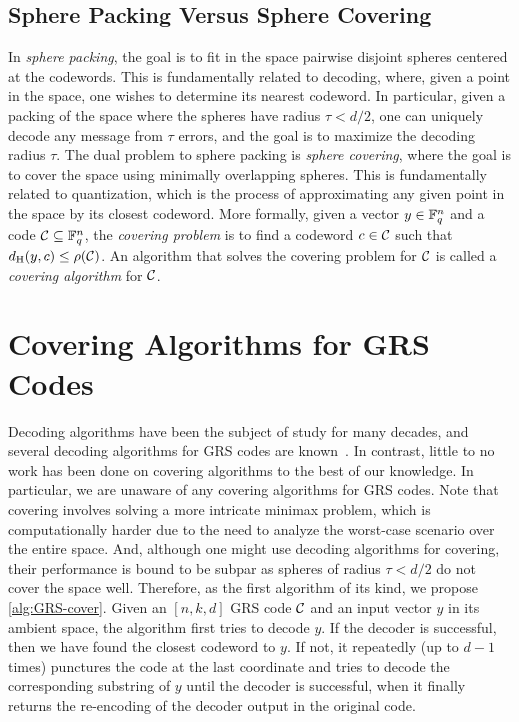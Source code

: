 \documentclass[conference]{IEEEtran}
\begin{document}
\subsection{Sphere Packing Versus Sphere Covering}
\label{sec:packing-covering}

In \emph{sphere packing}, the goal is to fit in the space pairwise disjoint spheres centered at the codewords. This is fundamentally related to decoding, where, given a point in the space, one wishes to determine its nearest codeword. In particular, given a packing of the space where the spheres have radius $\tau < d / 2$, one can uniquely decode any message from $\tau$ errors, and the goal is to maximize the decoding radius $\tau$. The dual problem to sphere packing is \emph{sphere covering}, where the goal is to cover the space using minimally overlapping spheres. 
This is fundamentally related to quantization, which is the process of approximating any given point in the space by its closest codeword.
More formally, given a vector $y \in {\mathbb F}_{q}^{n}$ and a code ${\mathcal C} \subseteq {\mathbb F}_{q}^{n}$, the \emph{covering problem} is to find a codeword $c \in {\mathcal C}$ such that $d_{{\rm H}}(y, c) \le \rho({\mathcal C})$. 
An algorithm that solves the covering problem for ${\mathcal C}$ is called a \emph{covering algorithm} for ${\mathcal C}$. 

\section{Covering Algorithms for GRS Codes}
\label{sec:covering}

Decoding algorithms have been the subject of study for many decades, and several decoding algorithms for GRS codes are known~\cite{Huffman03, Guruswami06}. 
In contrast, little to no work has been done on covering algorithms to the best of our knowledge. 
In particular, we are unaware of any covering algorithms for GRS codes. 
Note that covering involves solving a more intricate minimax problem, which is computationally harder due to the need to analyze the worst-case scenario over the entire space. 
And, although one might use decoding algorithms for covering, their performance is bound to be subpar as spheres of radius $\tau < d / 2$ do not cover the space well. 
Therefore, as the first algorithm of its kind, we propose \autoref{alg:GRS-cover}. 
Given an $[n, k, d]$ GRS code ${\mathcal C}$ and an input vector $y$ in its ambient space, the algorithm first tries to decode $y$. If the decoder is successful, then we have found the closest codeword to $y$. If not, it repeatedly (up to $d - 1$ times) punctures the code at the last coordinate and tries to decode the corresponding substring of $y$ until the decoder is successful,
when it finally returns the re-encoding of the decoder output in the original code. 
\end{document}
